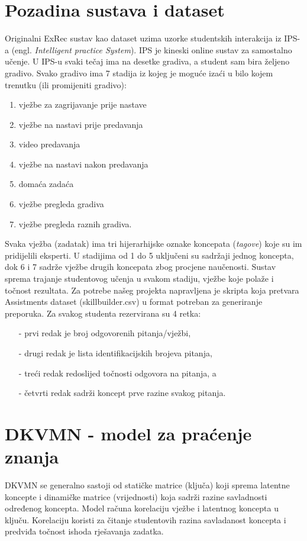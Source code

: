 \section{Pozadina sustava i dataset}
Originalni ExRec sustav kao dataset uzima uzorke studentskih interakcija iz IPS-a (engl. \textit{Intelligent practice System}).
IPS je kineski online sustav za samostalno učenje. U IPS-u svaki tečaj ima na desetke gradiva, a student sam bira željeno gradivo. Svako gradivo ima 7 stadija iz kojeg je moguće izaći u bilo kojem trenutku (ili promijeniti gradivo):
\begin{enumerate}
\item vježbe za zagrijavanje prije nastave
\item vježbe na nastavi prije predavanja
\item video predavanja
\item vježbe na nastavi nakon predavanja
\item domaća zadaća
\item vježbe pregleda gradiva
\item vježbe pregleda raznih gradiva.
\end{enumerate}
Svaka vježba (zadatak) ima tri hijerarhijske oznake koncepata (\textit{tagove}) koje su im pridijelili eksperti. U stadijima od 1 do 5 uključeni su sadržaji jednog koncepta, dok 6 i 7 sadrže vježbe drugih koncepata zbog procjene naučenosti. Sustav sprema trajanje studentovog učenja u svakom stadiju, vježbe koje polaže i točnost rezultata.\newline
\newline
Za potrebe našeg projekta napravljena je skripta koja pretvara Assistments dataset (skillbuilder.csv) u format potreban za generiranje preporuka.\newline
Za svakog studenta rezervirana su 4 retka:
\begin{itemize}
\item[-]prvi redak je broj odgovorenih pitanja/vježbi,
\item[-]drugi redak je lista identifikacijskih brojeva pitanja,
\item[-]treći redak redoslijed točnosti odgovora na pitanja, a
\item[-]četvrti redak sadrži koncept prve razine svakog pitanja.
\end{itemize}
\section{DKVMN - model za praćenje znanja}
DKVMN se generalno sastoji od statičke matrice (ključa) koji sprema latentne koncepte i dinamičke matrice (vrijednosti) koja sadrži razine savladnosti određenog koncepta. Model računa korelaciju vježbe i latentnog koncepta u ključu. Korelaciju koristi za čitanje studentovih razina savladanost koncepta i predviđa točnost ishoda rješavanja zadatka.\newline
